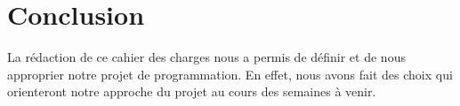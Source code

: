\chapter*{Conclusion}
La rédaction de ce cahier des charges nous a permis de définir et de nous approprier notre projet de programmation. En effet, nous avons fait des choix qui orienteront notre approche du projet au cours des semaines à venir.

\thispagestyle{empty}
